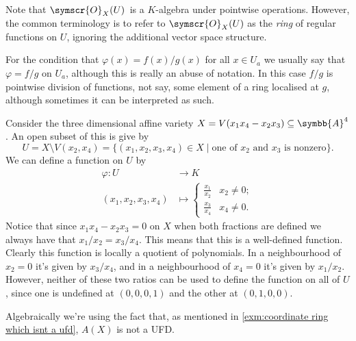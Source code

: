 \documentclass[fleqn]{NotesClass}
\newcommand{\affine}{\symbb{A}}
\newcommand{\sheaf}[1]{\symscr{#1}}
\begin{document}
    Note that \(\sheaf{O}_X(U)\)\ is a \(K\)-algebra under pointwise operations.
    However, the common terminology is to refer to \(\sheaf{O}_X(U)\) as the \emph{ring} of regular functions on \(U\), ignoring the additional vector space structure.
    
    \begin{ntn}{}{}
        For the condition that \(\varphi(x) = f(x)/g(x)\) for all \(x \in U_a\) we usually say that \(\varphi = f/g\) on \(U_a\), although this is really an abuse of notation.
        In this case \(f/g\) is pointwise division of functions, not say, some element of a ring localised at \(g\), although sometimes it can be interpreted as such.
    \end{ntn}
    
    \begin{exm}{}{}
        Consider the three dimensional affine variety \(X = V(x_1x_4 - x_2x_3) \subseteq \affine^4\).
        An open subset of this is give by
        \begin{equation}
            U = X \setminus V(x_2, x_4) = \{(x_1, x_2, x_3, x_4) \in X \mid \text{one of } x_2 \text{ and } x_3 \text{ is nonzero}\}.
        \end{equation}
        We can define a function on \(U\) by
        \begin{align}
            \varphi \colon U &\to K\\
            (x_1, x_2, x_3, x_4) &\mapsto
            \begin{cases}
                \frac{x_1}{x_2} & x_2 \ne 0;\\
                \frac{x_3}{x_4} & x_4 \ne 0.
            \end{cases}
        \end{align}
        Notice that since \(x_1 x_4 - x_2 x_3 = 0\) on \(X\) when both fractions are defined we always have that \(x_1/x_2 = x_3/x_4\).
        This means that this is a well-defined function.
        Clearly this function is locally a quotient of polynomials.
        In a neighbourhood of \(x_2 = 0\) it's given by \(x_3/x_4\), and in a neighbourhood of \(x_4 = 0\) it's given by \(x_1/x_2\).
        However, neither of these two ratios can be used to define the function on all of \(U\), since one is undefined at \((0, 0, 0, 1)\) and the other at \((0, 1, 0, 0)\).
        
        Algebraically we're using the fact that, as mentioned in \cref{exm:coordinate ring which isnt a ufd}, \(A(X)\) is not a UFD.
    \end{exm}
    
\end{document}
